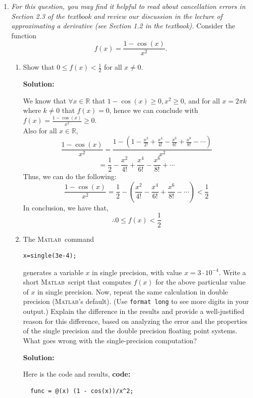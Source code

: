 \documentclass[11pt]{article}
\newcommand{\matlab}{\textsc{Matlab\ }}
\newcommand{\matlabns}{\textsc{Matlab}}
\newenvironment{solution}
  {\par\noindent\textbf{Solution:}\par}
  {\par}
\begin{document}
\begin{enumerate}
\begin{enumerate}
\begin{solution}
  \end{solution}
\end{enumerate}

\item {\em For this question, you may find it helpful to read about cancellation errors in Section 2.3 of the textbook and review our discussion in the lecture of approximating a derivative (see Section 1.2 in the textbook).} Consider the function 
$$ f(x) = \frac{1-\cos(x)}{x^2}.$$ 
\begin{enumerate}
\item Show that  $0 \leq f(x) < \frac12$ for all $x \ne 0$.

\begin{solution}
  We know that $\forall x \in \mathbb{R}$ that $1-\cos(x) \ge 0, x^2 \ge 0$, and for all $x = 2\pi k$ where $k \neq 0$ that $f(x) = 0$, hence we can conclude with $f(x) =\frac{1-\cos(x)}{x^2} \ge 0$. 
  \\ 
  Also for all $x \in \mathbb{R}$,
  $$\frac{1-\cos(x)}{x^2} = \frac{1 - \left( 1 - \frac{x^2}{2!} + \frac{x^4}{4!} - \frac{x^6}{6!} + \frac{x^8}{8!} - \cdots  \right)}{x^2}$$
  $$=\frac{1}{2} - \frac{x^2}{4!} + \frac{x^4}{6!} - \frac{x^6}{8!} + \cdots $$
  Thus, we can do the following:
  $$\frac{1-\cos(x)}{x^2} = \frac{1}{2} - \left( \frac{x^2}{4!} - \frac{x^4}{6!} + \frac{x^6}{8!} - \cdots \right) < \frac{1}{2} $$
  In conclusion, we have that,
  $$\therefore 0 \le f(x) < \frac{1}{2}$$

\end{solution}
\item 
The \matlab command
\begin{verbatim}
x=single(3e-4);
\end{verbatim}
generates a variable $x$ in single precision, with value $x=3 \cdot 10^{-4}$. 
Write a short \matlab script that computes $f(x)$ for the above particular value of $x$ in single precision. Now, repeat the same calculation in double precision (\matlabns's default).  (Use {\tt format long} to see more digits in your output.)
Explain the difference in the results and provide  a well-justified reason for this difference, based on analyzing the error and  the properties of the single precision and the double precision floating point systems. What goes wrong with the single-precision computation?

\begin{solution}
  Here is the code and results, \textbf{code:}
  \begin{verbatim}
  func = @(x) (1 - cos(x))/x^2;


\end{verbatim}
\end{solution}
\end{enumerate}
\end{enumerate}
\end{document}
